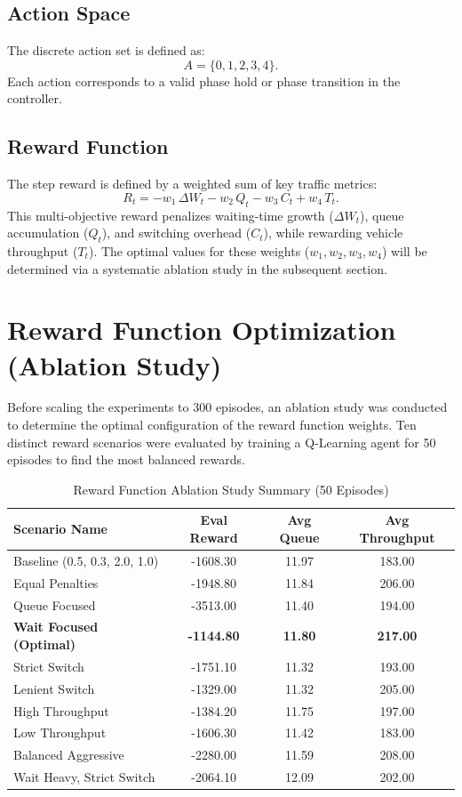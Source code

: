 \documentclass[11pt,a4paper]{article}
\begin{document}
\subsection{Action Space}
The discrete action set is defined as:
\[
A = \{0,1,2,3,4\}.
\]
Each action corresponds to a valid phase hold or phase transition in the controller.

\subsection{Reward Function}
The step reward is defined by a weighted sum of key traffic metrics:
\[
R_t = -w_1\,\Delta W_t - w_2\,Q_t - w_3\,C_t + w_4\,T_t.
\]
This multi-objective reward penalizes waiting-time growth ($\Delta W_t$), queue accumulation ($Q_t$), and switching overhead ($C_t$), while rewarding vehicle throughput ($T_t$). The optimal values for these weights ($w_1, w_2, w_3, w_4$) will be determined via a systematic ablation study in the subsequent section.

\section{Reward Function Optimization (Ablation Study)}
Before scaling the experiments to 300 episodes, an ablation study was conducted to determine the optimal configuration of the reward function weights. Ten distinct reward scenarios were evaluated by training a Q-Learning agent for 50 episodes to find the most balanced rewards.

\begin{table}[H]
\centering
\caption{Reward Function Ablation Study Summary (50 Episodes)}
\begin{tabular}{lccc}
\toprule
\textbf{Scenario Name} & \textbf{Eval Reward} & \textbf{Avg Queue} & \textbf{Avg Throughput} \\
\midrule
Baseline (0.5, 0.3, 2.0, 1.0) & -1608.30 & 11.97 & 183.00 \\
Equal Penalties & -1948.80 & 11.84 & 206.00 \\
Queue Focused & -3513.00 & 11.40 & 194.00 \\
\textbf{Wait Focused (Optimal)} & \textbf{-1144.80} & \textbf{11.80} & \textbf{217.00} \\
Strict Switch & -1751.10 & 11.32 & 193.00 \\
Lenient Switch & -1329.00 & 11.32 & 205.00 \\
High Throughput & -1384.20 & 11.75 & 197.00 \\
Low Throughput & -1606.30 & 11.42 & 183.00 \\
Balanced Aggressive & -2280.00 & 11.59 & 208.00 \\
Wait Heavy, Strict Switch & -2064.10 & 12.09 & 202.00 \\
\bottomrule
\end{tabular}
\end{table}
\end{document}
